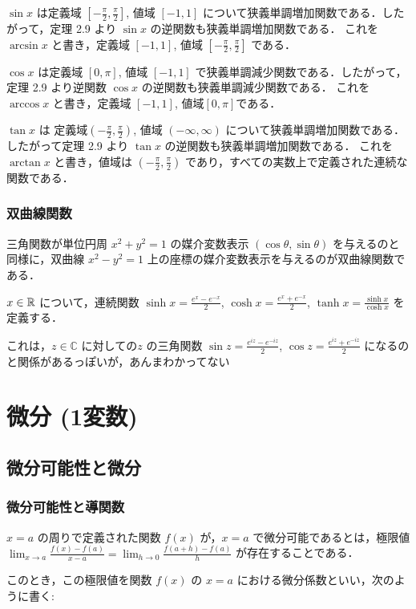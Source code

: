 \documentclass[xelatex,ja=standard,jafont=noto]{bxjsarticle}
\begin{document}
  $\sin x$ は定義域 $[-\frac{\pi}{2}, \frac{\pi}{2}]$, 値域 $[-1, 1]$ について狭義単調増加関数である．したがって，定理 2.9 より $\sin x$ の逆関数も狭義単調増加関数である．
  これを $\arcsin x$ と書き，定義域 $[-1, 1]$, 値域 $[-\frac{\pi}{2}, \frac{\pi}{2}]$ である． 


  $\cos x$ は定義域 $[0, \pi]$, 値域 $[-1, 1]$ で狭義単調減少関数である．したがって，定理 2.9 より逆関数 $\cos x$ の逆関数も狭義単調減少関数である．
  これを $\arccos x$ と書き，定義域 $[-1, 1]$, 値域$[0, \pi]$である． 


  $\tan x$ は 定義域$(-\frac{\pi}{2}, \frac{\pi}{2})$, 値域 $(-\infty, \infty)$ について狭義単調増加関数である．したがって定理 2.9 より $\tan x$ の逆関数も狭義単調増加関数である．
  これを $\arctan x$ と書き，値域は $(-\frac{\pi}{2}, \frac{\pi}{2})$ であり，すべての実数上で定義された連続な関数である．

  \subsubsection{双曲線関数}
  三角関数が単位円周 $x^2 + y^2 = 1$ の媒介変数表示 $(\cos\theta, \sin\theta)$ を与えるのと同様に，双曲線 $x^2 - y^2 = 1$ 上の座標の媒介変数表示を与えるのが双曲線関数である．

  $x\in\mathbb{R}$ について，連続関数 $\sinh x = \frac{e^x - e^{- x}}{2}$, $\cosh x = \frac{e^x + e^{- x}}{2}$, $\tanh x = \frac{\sinh x}{\cosh x}$ を定義する．
 
  これは，$z \in \mathbb{C}$ に対しての$z$ の三角関数 $\sin z = \frac{e^{iz} - e^{-iz}}{2}$, $\cos z = \frac{e^{iz} + e^{-iz}}{2}$ になるのと関係があるっぽいが，あんまわかってない

  \section{微分 (1変数)}
  \subsection{微分可能性と微分}
  \subsubsection{微分可能性と導関数}
  $x = a$ の周りで定義された関数 $f(x)$ が，$x = a$ で微分可能であるとは，極限値 $\lim_{x \rightarrow a} \frac{f(x) - f(a)}{x - a} = \lim_{h \rightarrow 0} \frac{f(a + h) - f(a)}{h}$ が存在することである．
  
  このとき，この極限値を関数 $f(x)$ の $x = a$ における微分係数といい，次のように書く: 
\end{document}
